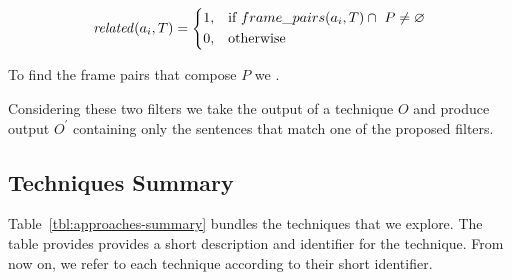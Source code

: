 \begin{equation}
\text{\textit{related}}(a_i, T) = \left \{
\begin{aligned}
    &1, && \text{if}\ frame\_pairs(a_i, T) \cap ~P \ne \emptyset \\
    &0, && \text{otherwise}
\end{aligned} \right.
\end{equation} 

\smallskip
To find the frame pairs that compose $P$ we .



Considering these two filters we take the output of a technique $O$ and produce output $O^{\prime}$ containing only the sentences that match one of the proposed filters.




\subsection{Techniques Summary}


Table~\ref{tbl:approaches-summary} bundles the techniques that we explore.
The table provides provides a short description and identifier for the technique. From now on, we refer to each technique according to their short identifier.


